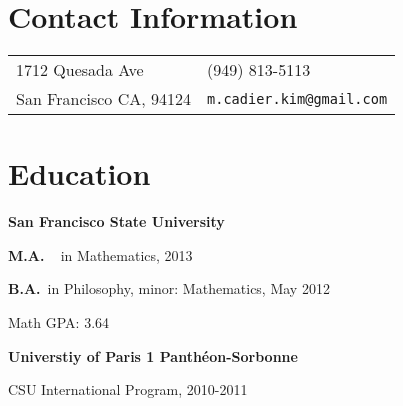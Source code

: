 \documentclass[margin,line,pifont,palatino,courier]{res}
\newenvironment{list1}{
  \begin{list}{\ding{113}}{%
      \setlength{\itemsep}{0in}
      \setlength{\parsep}{0in} \setlength{\parskip}{0in}
      \setlength{\topsep}{0in} \setlength{\partopsep}{0in}
      \setlength{\leftmargin}{0.17in}}}{\end{list}}
\begin{document}

\begin{resume}

\section{\sc Contact Information}

\vspace{.05in}
\begin{tabular}{@{}p{2.75in}p{2in}}
1712 Quesada Ave      & (949) 813-5113 \\
     San Francisco CA, 94124                     & \verb+m.cadier.kim@gmail.com+\\

\end{tabular}

 
 \section{\sc Education}



{\bf San Francisco State University}\\
\vspace*{-.1in}
\begin{list1}
\item  \textbf{M.A.} ~ in Mathematics, 2013


\item \textbf{B.A.}~in Philosophy, minor:    
Mathematics, May 2012

Math GPA: 3.64  




\item {\bf Universtiy of Paris 1 Panth\'{e}on-Sorbonne}


CSU International Program,  2010-2011


\end{list1}
\end{resume}
\end{document}
